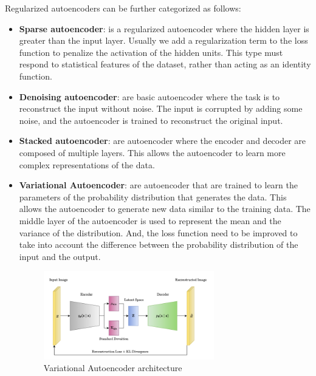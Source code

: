 Regularized autoencoders can be further categorized as follows:
\begin{itemize}
    \item \textbf{Sparse autoencoder}: is a regularized autoencoder where the
          hidden layer is greater than the input layer. Usually we add a
          regularization term to the loss function to penalize the activation
          of the hidden units. This type must respond to statistical features of
          the dataset, rather than acting as an identity function.
    \item \textbf{Denoising autoencoder}: are basic autoencoder where the task
          is to reconstruct the input without noise. The input is corrupted by
          adding some noise, and the autoencoder is trained to reconstruct the
          original input.
    \item \textbf{Stacked autoencoder}: are autoencoder where the encoder and
          decoder are composed of multiple layers. This allows the autoencoder
          to learn more complex representations of the data.
    \item \textbf{Variational Autoencoder}: are autoencoder that are trained to
          learn the parameters of the probability distribution that generates
          the data. This allows the autoencoder to generate new data similar to
          the training data. The middle layer of the autoencoder is used to
          represent the mean and the variance of the distribution. And, the loss
          function need to be improved to take into account the difference between
          the probability distribution of the input and the output.
          \begin{figure}[!ht]
                \centering
                \includegraphics[width=0.7\textwidth]{img/Autoencoder/VAE.png}
                \caption{Variational Autoencoder architecture}
                \label{fig:variational_autoencoder}
          \end{figure}
\end{itemize}